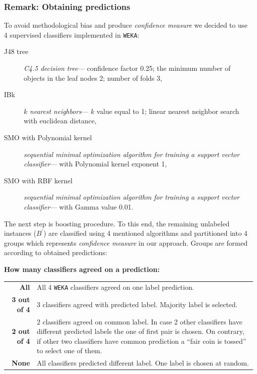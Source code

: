 \documentclass[12pt, a4paper, pdflatex]{report}
\begin{document}
\subsubsection{Remark: Obtaining predictions}
To avoid methodological bias and produce \emph{confidence measure} we decided to use 4 supervised classifiers implemented in \texttt{WEKA}:
\begin{description}
\item[J48 tree] \emph{C4.5 decision tree}--- confidence factor 0.25; the minimum number of objects in the leaf nodes 2; number of folds 3,
\item[IBk] \emph{$k$ nearest neighbors}--- $k$ value equal to 1; linear nearest neighbor search with euclidean distance,
\item[SMO with Polynomial kernel] \emph{sequential minimal optimization algorithm for training a support vector classifier}--- with Polynomial kernel exponent 1,
\item[SMO with RBF kernel] \emph{sequential minimal optimization algorithm for training a support vector classifier}--- with Gamma value 0.01.
\end{description}

The next step is boosting procedure. To this end, the remaining unlabeled instances ($B^{\prime}$) are classified using 4 mentioned algorithms and partitioned into 4 groups which represents \emph{confidence measure} in our approach. Groups are formed according to obtained predictions:\\[-0.6cm]
\begin{center}\textbf{How many classifiers agreed on a prediction:}\end{center}
\begin{tabular}{rp{12cm}}
\textbf{All} & All 4 \texttt{WEKA} classifiers agreed on one label prediction.\\
\textbf{3 out of 4} & 3 classifiers agreed with predicted label. Majority label is selected.\\
\textbf{2 out of 4} & 2 classifiers agreed on common label. In case 2 other classifiers have different predicted labels the one of first pair is chosen. On contrary, if other two classifiers have common prediction a ``fair coin is tossed'' to select one of them.\\
\textbf{None} & All classifiers predicted different label. One label is chosen at random.\\[0.4cm]
\end{tabular}
\end{document}
